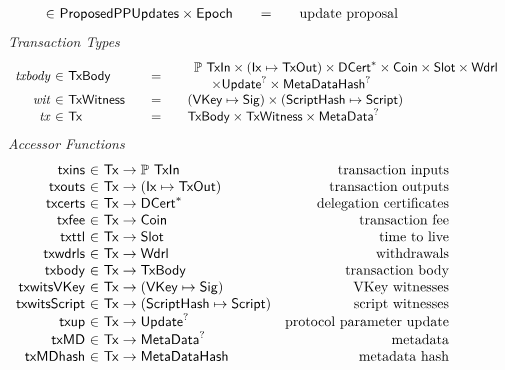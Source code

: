 \begin{figure*}[htb]
\begin{equation*}
\begin{array}{r@{~\in~}l@{\qquad=\qquad}lr}
      & \ProposedPPUpdates \times \Epoch
      & \text{update proposal}
    \end{array}
  \end{equation*}
  \emph{Transaction Types}
  \begin{equation*}
    \begin{array}{r@{~\in~}l@{\qquad=\qquad}l}
      \var{txbody}
      & \TxBody
      & \begin{array}{l}
        \powerset{\TxIn} \times (\Ix \mapsto \TxOut) \times \seqof{\DCert}
        \times \Coin \times \Slot \times \Wdrl
        \\ ~~~~\times \Update^? \times \MetaDataHash^?
        \end{array}
      \\
      \var{wit} & \TxWitness & (\VKey \mapsto \Sig) \times (\HashScr \mapsto \Script)
      \\
      \var{tx}
      & \Tx
      & \TxBody \times \TxWitness \times \MetaData^?
    \end{array}
  \end{equation*}
  \emph{Accessor Functions}
  \begin{equation*}
    \begin{array}{r@{~\in~}lr}
      \fun{txins} & \Tx \to \powerset{\TxIn} & \text{transaction inputs} \\
      \fun{txouts} & \Tx \to (\Ix \mapsto \TxOut) & \text{transaction outputs} \\
      \fun{txcerts} & \Tx \to \seqof{\DCert} & \text{delegation certificates} \\
      \fun{txfee} & \Tx \to \Coin & \text{transaction fee} \\
      \fun{txttl} & \Tx \to \Slot & \text{time to live} \\
      \fun{txwdrls} & \Tx \to \Wdrl & \text{withdrawals} \\
      \fun{txbody} & \Tx \to \TxBody & \text{transaction body}\\
      \fun{txwitsVKey} & \Tx \to (\VKey \mapsto \Sig) & \text{VKey witnesses} \\
      \fun{txwitsScript} & \Tx \to (\HashScr \mapsto \Script) & \text{script witnesses}\\
      \fun{txup} & \Tx \to \Update^? & \text{protocol parameter update}\\
      \fun{txMD} & \Tx \to \MetaData^? & \text{metadata}\\
      \fun{txMDhash} & \Tx \to \MetaDataHash & \text{metadata hash}\\

\end{array}
\end{equation*}
\end{figure*}
